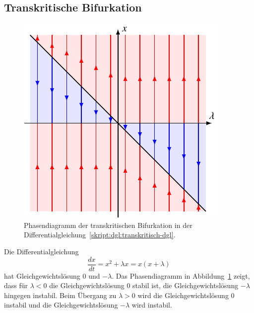 \subsection{Transkritische Bifurkation}
%
\begin{figure}
\centering
\includegraphics{chapters/3/trans.pdf}
\caption{Phasendiagramm der transkritischen Bifurkation in der
Differentialgleichung~\eqref{skript:dgl:transkritisch-dgl}.
\label{skript:dgl:transfig}}
\end{figure}
Die Differentialgleichung
\begin{equation}
\frac{dx}{dt}
=
x^2 + \lambda x
=
x(x+\lambda)
\label{skript:dgl:transkritisch-dgl}
\end{equation}
hat Gleichgewichtslösung $0$ und $-\lambda$.
Das Phasendiagramm in Abbildung~\ref{skript:dgl:transfig} zeigt, dass 
für $\lambda<0$ die Gleichgewichtslösung $0$ stabil ist, die
Gleichgewichtslösung $-\lambda$ hingegen instabil.
Beim Übergang zu $\lambda>0$ wird die Gleichgewichtslösung $0$ instabil
und die Gleichgewichtslösung $-\lambda$ wird instabil.

